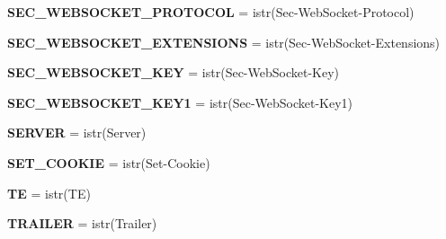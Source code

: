 \begin{DoxyCompactItemize}
\item 
\mbox{\label{namespaceaiohttp_1_1hdrs_a0ad8a776f73b065b72a2c4b306bf64da}} 
{\bfseries S\+E\+C\+\_\+\+W\+E\+B\+S\+O\+C\+K\+E\+T\+\_\+\+P\+R\+O\+T\+O\+C\+OL} = istr(\textquotesingle{}Sec-\/Web\+Socket-\/Protocol\textquotesingle{})
\item 
\mbox{\label{namespaceaiohttp_1_1hdrs_a6860841dcb57ac3077f10f048f188830}} 
{\bfseries S\+E\+C\+\_\+\+W\+E\+B\+S\+O\+C\+K\+E\+T\+\_\+\+E\+X\+T\+E\+N\+S\+I\+O\+NS} = istr(\textquotesingle{}Sec-\/Web\+Socket-\/Extensions\textquotesingle{})
\item 
\mbox{\label{namespaceaiohttp_1_1hdrs_aa8a756356a706103b8ad0c84ab712130}} 
{\bfseries S\+E\+C\+\_\+\+W\+E\+B\+S\+O\+C\+K\+E\+T\+\_\+\+K\+EY} = istr(\textquotesingle{}Sec-\/Web\+Socket-\/Key\textquotesingle{})
\item 
\mbox{\label{namespaceaiohttp_1_1hdrs_ad32ded513aa0c994a6ba60e89e9b5734}} 
{\bfseries S\+E\+C\+\_\+\+W\+E\+B\+S\+O\+C\+K\+E\+T\+\_\+\+K\+E\+Y1} = istr(\textquotesingle{}Sec-\/Web\+Socket-\/Key1\textquotesingle{})
\item 
\mbox{\label{namespaceaiohttp_1_1hdrs_a8339f225eb1ee135186f7fbfafd1e38d}} 
{\bfseries S\+E\+R\+V\+ER} = istr(\textquotesingle{}Server\textquotesingle{})
\item 
\mbox{\label{namespaceaiohttp_1_1hdrs_a8c38266595d422113a6d36eec4f68d00}} 
{\bfseries S\+E\+T\+\_\+\+C\+O\+O\+K\+IE} = istr(\textquotesingle{}Set-\/Cookie\textquotesingle{})
\item 
\mbox{\label{namespaceaiohttp_1_1hdrs_aef504f76d0344922805015e2d8eb8dea}} 
{\bfseries TE} = istr(\textquotesingle{}TE\textquotesingle{})
\item 
\mbox{\label{namespaceaiohttp_1_1hdrs_a2334670a04a815c64399dcb192ae80e0}} 
{\bfseries T\+R\+A\+I\+L\+ER} = istr(\textquotesingle{}Trailer\textquotesingle{})
\item 
\mbox{\label{namespaceaiohttp_1_1hdrs_a77c3a416a05dc85872379a3e242ac673}} 

\end{DoxyCompactItemize}
